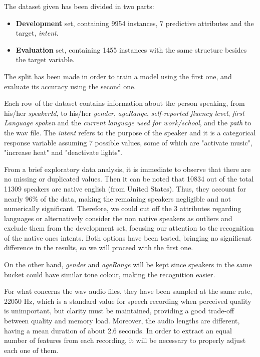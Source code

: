 \documentclass[conference]{IEEEtran}
\begin{document}
The dataset given has been divided in two parts:
\begin{itemize}
    \item \textbf{Development} set, containing 9954 instances, 7 predictive attributes and the target, \textit{intent}.
    \item \textbf{Evaluation} set, containing 1455 instances with the same structure besides the target variable.
\end{itemize}
The split has been made in order to train a model using the first one, and evaluate its accuracy using the second one.

Each row of the dataset contains information about the person speaking, from his/her \textit{speakerId}, to his/her \textit{gender}, \textit{ageRange}, \textit{self-reported fluency level}, \textit{first Language spoken} and the \textit{current language used for work/school}, and the \textit{path} to the wav file.
The \textit{intent} refers to the purpose of the speaker and it is a categorical response variable assuming 7 possible values, some of which are "activate music", "increase heat" and "deactivate lights".

From a brief exploratory data analysis, it is immediate to observe that there are no missing or duplicated values. 
Then it can be noted that 10834 out of the total 11309 speakers are native english (from United States).
Thus, they account for nearly 96\% of the data, making the remaining speakers negligible and not numerically significant.
Therefore, we could cut off the 3 attributes regarding languages or alternatively consider the non native speakers as outliers and exclude them from the development set, focusing our attention to the recognition of the native ones intents.
Both options have been tested, bringing no significant difference in the results, so we will proceed with the first one.

On the other hand, \textit{gender} and \textit{ageRange} will be kept since speakers in the same bucket could have similar tone colour, making the recognition easier.

For what concerns the wav audio files, they have been sampled at the same rate, 22050 Hz, which is a standard value for speech recording when perceived quality is unimportant, but clarity must be maintained, providing a good trade-off between quality and memory load.
Moreover, the audio lengths are different, having a mean duration of about 2.6 seconds.
In order to extract an equal number of features from each recording, it will be necessary to properly adjust each one of them. 
\end{document}
